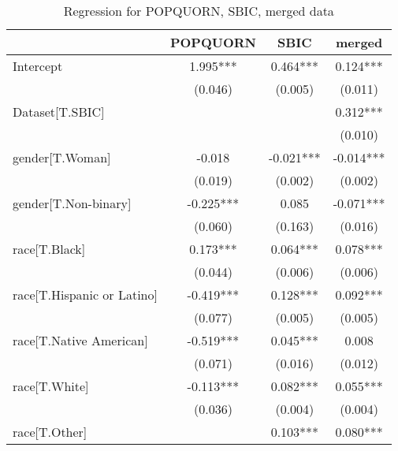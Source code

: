 \begin{table}
\caption{Regression for POPQUORN, SBIC, merged data}
\label{}
\begin{center}
\begin{tabular}{lccc}
\hline
                                  & POPQUORN  & SBIC      & merged     \\
\hline
Intercept                         & 1.995***   & 0.464***    & 0.124***     \\
                                  & (0.046)    & (0.005)     & (0.011)      \\
Dataset[T.SBIC]                   &            &             &\cellcolor{green!25} 0.312***     \\
                                  &            &             & (0.010)      \\
gender[T.Woman]                   & -0.018     & \cellcolor{red!25}-0.021***   &\cellcolor{red!25} -0.014***    \\
                                  & (0.019)    & (0.002)     & (0.002)      \\
gender[T.Non-binary]              &\cellcolor{red!25} -0.225***  & 0.085       &\cellcolor{red!25} -0.071***    \\
                                  & (0.060)    & (0.163)     & (0.016)      \\
race[T.Black] &\cellcolor{green!25} 0.173***   &\cellcolor{green!25} 0.064***    &\cellcolor{green!25} 0.078***     \\
                                  & (0.044)    & (0.006)     & (0.006)      \\
race[T.Hispanic or Latino]        &\cellcolor{red!25} -0.419***  &\cellcolor{green!25} 0.128***    & \cellcolor{green!25}0.092***     \\
                                  & (0.077)    & (0.005)     & (0.005)      \\
race[T.Native American]           &\cellcolor{red!25} -0.519***  &\cellcolor{green!25} 0.045***    & 0.008        \\
                                  & (0.071)    & (0.016)     & (0.012)      \\
race[T.White]                     &\cellcolor{red!25} -0.113***  &\cellcolor{green!25} 0.082***    &\cellcolor{green!25} 0.055***     \\
                                  & (0.036)    & (0.004)     & (0.004)      \\
race[T.Other]                     &            &\cellcolor{green!25} 0.103***    &\cellcolor{green!25} 0.080***     \\

\end{tabular}
\end{center}
\end{table}
